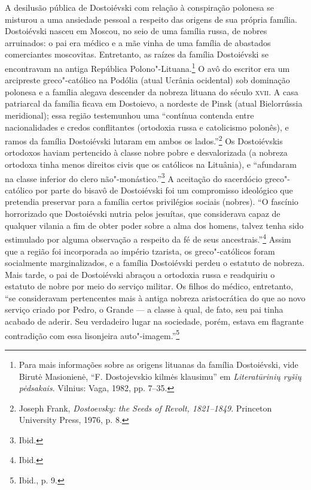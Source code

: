 A desilusão pública de Dostoiévski com relação à conspiração polonesa se
misturou a uma ansiedade pessoal a respeito das origens de sua própria
família. Dostoiévski nasceu em Moscou, no seio de uma família russa, de
nobres arruinados: o pai era médico e a mãe vinha de uma família de
abastados comerciantes moscovitas. Entretanto, as raízes da família
Dostoiévski se encontravam na antiga República Polono"-Lituana.\footnote{Para mais informações sobre as origens lituanas da família Dostoiévski, vide Birutė Masionienė, ``F. Dostojevskio kilmės klausimu'' em \textit{Literatūrinių ryšių pėdsakais}. Vilnius: Vaga, 1982, pp. 7--35.} O avô do escritor era um arcipreste greco"-católico na Podólia (atual
Ucrânia ocidental) sob dominação polonesa e a família alegava descender
da nobreza lituana do século \textsc{xvii}. A casa patriarcal da família ficava em
Dostoievo, a nordeste de Pinsk (atual Bielorrússia meridional); essa
região testemunhou uma ``contínua contenda entre nacionalidades e credos
conflitantes (ortodoxia russa e catolicismo polonês), e ramos da família
Dostoiévski lutaram em ambos os lados.''\footnote{Joseph Frank, \textit{Dostoevsky: the Seeds of Revolt, 1821--1849}. Princeton University Press, 1976, p. 8.} Os Dostoiévskis ortodoxos haviam pertencido à classe nobre pobre e desvalorizada (a nobreza ortodoxa
tinha menos direitos civis que os católicos na Lituânia), e ``afundaram
na classe inferior do clero não"-monástico.''\footnote{Ibid.} A aceitação
do sacerdócio greco"-católico por parte do bisavô de Dostoiévski foi um
compromisso ideológico que pretendia preservar para a família certos
privilégios sociais (nobres). ``O fascínio horrorizado que Dostoiévski
nutria pelos jesuítas, que considerava capaz de qualquer vilania a fim
de obter poder sobre a alma dos homens, talvez tenha sido estimulado por
alguma observação a respeito da fé de seus ancestrais.''\footnote{Ibid.}
Assim que a região foi incorporada ao império tzarista, os
greco"-católicos foram socialmente marginalizados, e a família
Dostoiévski perdeu o estatuto de nobreza. Mais tarde, o pai de
Dostoiévski abraçou a ortodoxia russa e readquiriu o estatuto de nobre
por meio do serviço militar. Os filhos do médico, entretanto, ``se
consideravam pertencentes mais à antiga nobreza aristocrática do que ao
novo serviço criado por Pedro, o Grande --- a classe à qual, de fato, seu
pai tinha acabado de aderir. Seu verdadeiro lugar na sociedade, porém,
estava em flagrante contradição com essa lisonjeira
auto"-imagem.''\footnote{Ibid., p. 9.}

